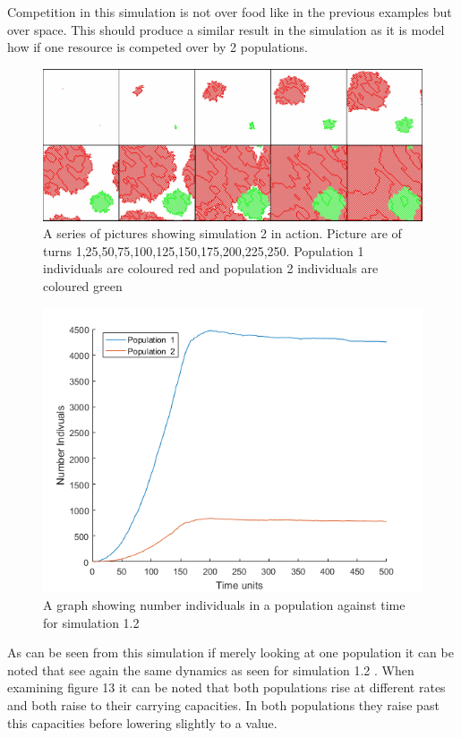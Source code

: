 \documentclass[final]{cmpreport}
\begin{document}
		Competition in this simulation is not over food like in the previous examples but over space. This should produce a similar result in the simulation as it is model how if one resource is competed over by 2 populations.
		
		\begin{figure}[h!] 
			\includegraphics[width=\textwidth]{simulation2Collage.png}
			\caption{A series of pictures showing simulation 2 in action. Picture are of turns 1,25,50,75,100,125,150,175,200,225,250. Population 1 individuals are coloured red and population 2 individuals are coloured green}
		\end{figure}
		
		\begin{figure}[h!] 
			\includegraphics[width=\textwidth]{Simulation2GraphNumberInviduals.png}
			\caption{A graph showing number individuals in a population against time for simulation 1.2}
		\end{figure}
		
		As can be seen from this simulation if merely looking at one population it can be noted that see again the same dynamics as seen for simulation 1.2 . When examining figure 13 it can be noted that both populations rise at different rates and both raise to their carrying capacities. In both populations they raise past this capacities before lowering slightly to a value.
		
\end{document}

